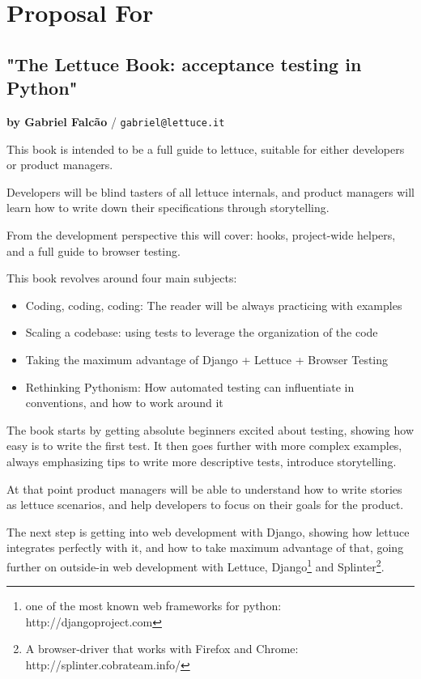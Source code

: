 \documentclass[letterpaper]{article}
\begin{document}
\section*{Proposal For}

\subsection*{"The Lettuce Book: acceptance testing in Python"}
\normalsize\textbf{by Gabriel Falcão} \large{/} \texttt{gabriel@lettuce.it}

\normalsize

This book is intended to be a full guide to lettuce, suitable for
either developers or product managers.

Developers will be blind tasters of all lettuce internals, and product
managers will learn how to write down their specifications through
storytelling.

\noindent
From the development perspective this will cover: hooks, project-wide
helpers, and a full guide to browser testing.

\noindent
This book revolves around four main subjects:

\begin{itemize}

\item{Coding, coding, coding: The reader will be always practicing with examples}

\item{Scaling a codebase: using tests to leverage the organization of the code}

\item{Taking the maximum advantage of Django + Lettuce + Browser Testing}

\item{Rethinking Pythonism: How automated testing can influentiate in conventions, and how to work around it}
\end{itemize}


The book starts by getting absolute beginners excited about testing, showing how easy is to write the first test.
It then goes further with more complex examples, always emphasizing
tips to write more descriptive tests, introduce storytelling.

At that point product managers will be able to understand how to write
stories as lettuce scenarios, and help developers to focus on their
goals for the product.

\noindent
The next step is getting into web development with Django, showing how
lettuce integrates perfectly with it, and how to take maximum
advantage of that, going further on outside-in web development with
Lettuce, Django\footnote{one of the most known web frameworks for python: http://djangoproject.com} and Splinter\footnote{A browser-driver that works with Firefox and Chrome: http://splinter.cobrateam.info/}.
\end{document}
